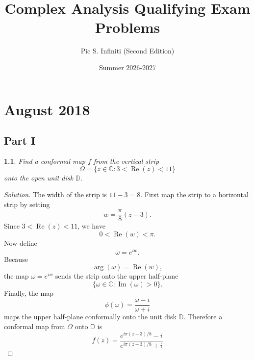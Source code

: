 \documentclass[12pt, a4paper]{report}
\title{Complex Analysis Qualifying Exam Problems}
\author{
  Pic S. Infiniti (Second Edition)
}
\date{Summer 2026-2027}
\theoremstyle{spaced}
\newtheorem{exercise}{}
\begin{document}
\hypersetup{pageanchor=false}
\maketitle

\tableofcontents

\hypersetup{pageanchor=true}
\chapter{August 2018}
\section{Part I}
\begin{exercise}
	Find a conformal map \(f\) from the vertical strip
	\[
		\Omega=\{z\in\mathbb{C}:3<\operatorname{Re}(z)<11\}
	\]
	onto the open unit disk \(\mathbb{D}\).
\end{exercise}

\begin{proof}[Solution]
	The width of the strip is \(11-3=8\). First map the strip to a horizontal strip by setting
	\[
		w=\frac{\pi}{8}(z-3).
	\]
	Since \(3<\operatorname{Re}(z)<11\), we have
	\[
		0<\operatorname{Re}(w)<\pi.
	\]
	Now define
	\[
		\omega=e^{iw}.
	\]
	Because
	\[
		\arg(\omega)=\operatorname{Re}(w),
	\]
	the map \(\omega=e^{iw}\) sends the strip onto the upper half-plane
	\[
		\{\omega\in\mathbb{C}:\operatorname{Im}(\omega)>0\}.
	\]
	Finally, the map
	\[
		\phi(\omega)=\frac{\omega-i}{\omega+i}
	\]
	maps the upper half-plane conformally onto the unit disk \(\mathbb{D}\). Therefore a conformal map from \(\Omega\) onto \(\mathbb{D}\) is
	\[
		f(z)=\frac{e^{i\pi(z-3)/8}-i}{e^{i\pi(z-3)/8}+i}
	\]
\end{proof}
\end{document}
